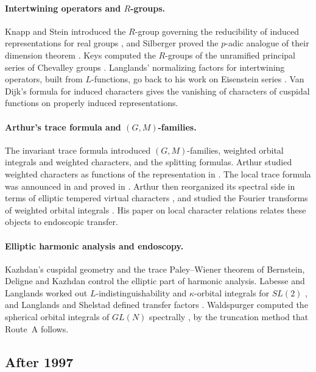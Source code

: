 \documentclass[12pt,letterpaper]{article}
\numberwithin{equation}{section}
\theoremstyle{plain}
\theoremstyle{definition}
\theoremstyle{remark}
\begin{document}
\paragraph{Intertwining operators and $R$-groups.} Knapp and Stein introduced the $R$-group governing the reducibility of induced representations for real groups \cite{KS71}, and Silberger proved the $p$-adic analogue of their dimension theorem \cite{Si78}. Keys computed the $R$-groups of the unramified principal series of Chevalley groups \cite{Ke82}. Langlands' normalizing factors for intertwining operators, built from $L$-functions, go back to his work on Eisenstein series \cite{La76}. Van Dijk's formula for induced characters \cite{vD72} gives the vanishing of characters of cuspidal functions on properly induced representations.

\paragraph{Arthur's trace formula and $(G,M)$-families.} The invariant trace formula \cite{Ar81,Ar88} introduced $(G,M)$-families, weighted orbital integrals and weighted characters, and the splitting formulas. Arthur studied weighted characters as functions of the representation in \cite{Ar89b}. The local trace formula was announced in \cite{Ar89a} and proved in \cite{Ar91}. Arthur then reorganized its spectral side in terms of elliptic tempered virtual characters \cite{Ar93}, and studied the Fourier transforms of weighted orbital integrals \cite{Ar94}. His paper on local character relations \cite{Ar96} relates these objects to endoscopic transfer.

\paragraph{Elliptic harmonic analysis and endoscopy.} Kazhdan's cuspidal geometry \cite{Ka86} and the trace Paley--Wiener theorem of Bernstein, Deligne and Kazhdan \cite{BDK86} control the elliptic part of harmonic analysis. Labesse and Langlands worked out $L$-indistinguishability and $\kappa$-orbital integrals for $SL(2)$ \cite{LL79}, and Langlands and Shelstad defined transfer factors \cite{LS87}. Waldspurger computed the spherical orbital integrals of $GL(N)$ spectrally \cite{Wa89a}, by the truncation method that Route~A follows.

\subsection{After 1997}\label{s:litpost}
\end{document}
